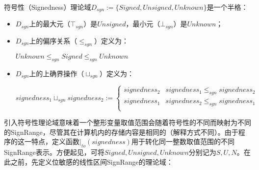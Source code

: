 \begin{definition}
	符号性（Signedness）理论域$ D_{sgn} := \{Signed, Unsigned, Unknown\} $是一个半格：
	\begin{itemize}
		\item $ D_{sgn} $上的最大元（$ \top_{sgn} $）是$ Unsigned $，最小元（$ \bot_{sgn} $）是$ Unknown $；
		\item $ D_{sgn} $上的偏序关系（$ \le_{sgn} $）定义为：\\
			\centerline{$ Unknown \le_{sgn} Signed \le_{sgn} Unknown $}
		\item $ D_{sgn} $上的上确界操作（$ \sqcup_{sgn} $）定义为：\\
			\centerline{$ signedness_1 \sqcup_{sgn} signedness_2 := \begin{cases}
				signedness_2 & signedness_1 \le_{sgn} signedness_2\\
				signedness_1 & signedness_2 \le_{sgn} signedness_1\\
				\end{cases} $}
	\end{itemize}
\end{definition}

引入符号性理论域意味着一个整形变量取值范围会随着符号性的不同而映射为不同的SignRange，尽管其在计算机内的存储内容是相同的（解释方式不同）。由于程序的这一特点，定义函数$ |_{to}(signedness) $用于转化同一整数取值范围的不同SignRange表示。方便起见，可将$ Signed, Unsigned, Unknown $分别记为$ S, U, N $。在此之前，先定义位敏感的线性区间SignRange的理论域：

